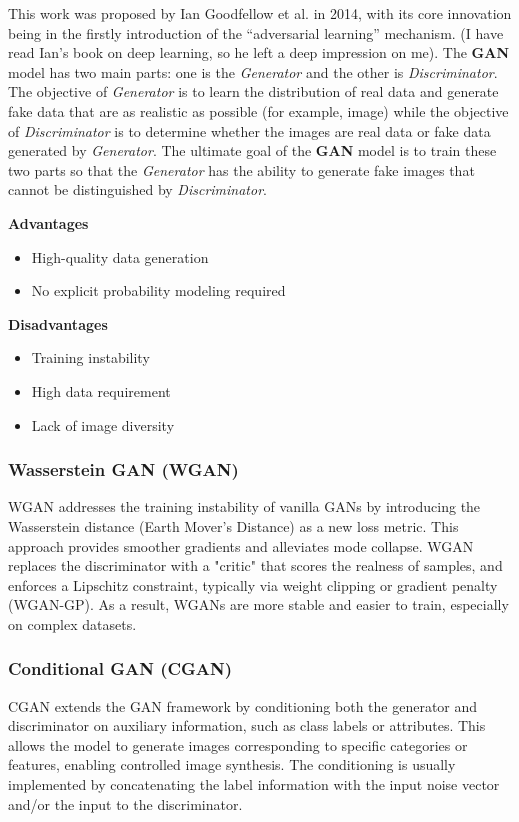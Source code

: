 \documentclass{article}
\begin{document}
This work was proposed by Ian Goodfellow et al. in 2014, with its core innovation being in the firstly 
introduction of the ``adversarial learning'' mechanism. (I have read Ian's book on deep learning, so he left 
a deep impression on me). The \textbf{GAN} model has two main parts: one is the \textit{Generator} and the 
other is \textit{Discriminator}. The objective of \textit{Generator} is to learn the distribution of real 
data and generate fake data that are as realistic as possible (for example, image) while the objective of 
\textit{Discriminator} is to determine whether the images are real data or fake data generated by 
\textit{Generator}. The ultimate goal of the \textbf{GAN} model is to train these two parts so that the 
\textit{Generator} has the ability to generate fake images that cannot be distinguished by 
\textit{Discriminator}.

\textbf{Advantages}
\begin{itemize}
    \item High-quality data generation
    \item No explicit probability modeling required
\end{itemize}

\textbf{Disadvantages}
\begin{itemize}
    \item Training instability
    \item High data requirement
    \item Lack of image diversity
\end{itemize}

\subsubsection{Wasserstein GAN (WGAN)}
WGAN addresses the training instability of vanilla GANs by introducing the Wasserstein distance (Earth Mover's Distance) as a new loss metric. This approach provides smoother gradients and alleviates mode collapse. WGAN replaces the discriminator with a "critic" that scores the realness of samples, and enforces a Lipschitz constraint, typically via weight clipping or gradient penalty (WGAN-GP). As a result, WGANs are more stable and easier to train, especially on complex datasets.

\subsubsection{Conditional GAN (CGAN)}
CGAN extends the GAN framework by conditioning both the generator and discriminator on auxiliary information, such as class labels or attributes. This allows the model to generate images corresponding to specific categories or features, enabling controlled image synthesis. The conditioning is usually implemented by concatenating the label information with the input noise vector and/or the input to the discriminator.
\end{document}
